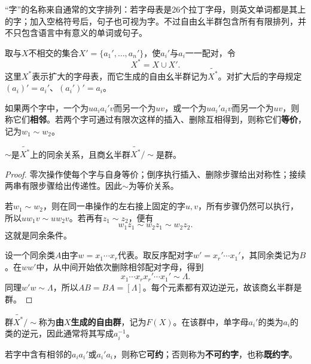 “字”的名称来自通常的文字排列：若字母表是26个拉丁字母，则英文单词都是其上的字；加入空格符号后，句子也可视为字。不过自由幺半群包含所有有限排列，并不只包含语言中有意义的单词或句子。

\begin{construction}
取与$X$不相交的集合$X'=\{a_1',\ldots,a_n'\}$，使$a_i'$与$a_i$一一配对，令
\[
X^*=X\cup X'.
\]
这里$X^*$表示扩大的字母表，而它生成的自由幺半群记为$\widetilde{X^*}$。对扩大后的字母规定$(a_i)'=a_i'$、$(a_i')'=a_i$。

如果两个字中，一个为$ua_ia_i'v$而另一个为$uv$，或一个为$ua_i'a_iv$而另一个为$uv$，则称它们\textbf{相邻}。若两个字可通过有限次这样的插入、删除互相得到，则称它们\textbf{等价}，记为$w_1\sim w_2$。
\end{construction}

\begin{proposition}
$\sim$是$\widetilde{X^*}$上的同余关系，且商幺半群$\widetilde{X^*}/{\sim}$是群。
\end{proposition}
\begin{proof}
零次操作使每个字与自身等价；倒序执行插入、删除步骤给出对称性；接续两串有限步骤给出传递性。因此$\sim$为等价关系。

若$w_1\sim w_2$，则在同一串操作的左右接上固定的字$u,v$，所有步骤仍然可以执行，所以$uw_1v\sim uw_2v$。若再有$z_1\sim z_2$，便有
\[
w_1z_1\sim w_2z_1\sim w_2z_2.
\]
这就是同余条件。

设一个同余类$A$由字$w=x_1\cdots x_r$代表。取反序配对字$w'=x_r'\cdots x_1'$，其同余类记为$B$。在$ww'$中，从中间开始依次删除相邻配对字母，得到
\[
x_1\cdots x_rx_r'\cdots x_1'\sim\Lambda.
\]
同理$w'w\sim\Lambda$，所以$AB=BA=[\Lambda]$。每个元素都有双边逆元，故该商幺半群是群。
\end{proof}

\begin{definition}
群$\widetilde{X^*}/{\sim}$称为\textbf{由$X$生成的自由群}，记为$F(X)$。在该群中，单字母$a_i'$的类为$a_i$的类的逆元，因此通常将其写成$a_i^{-1}$。

若字中含有相邻的$a_ia_i'$或$a_i'a_i$，则称它\textbf{可约}；否则称为\textbf{不可约字}，也称\textbf{既约字}。
\end{definition}

